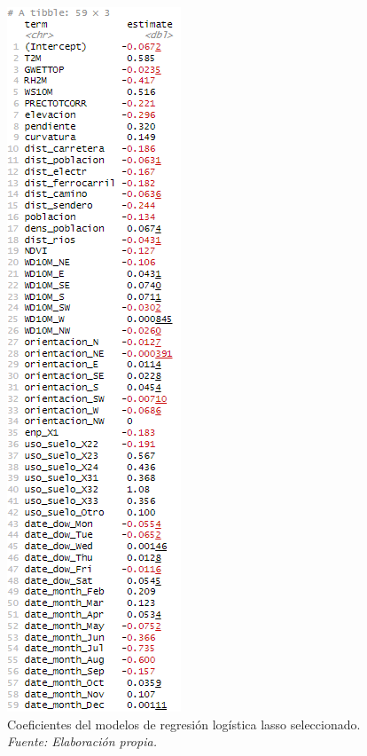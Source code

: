 \documentclass[12pt,a4paper,]{book}
\numberwithin{dummy}{section}
\theoremstyle{ocrenumbox}
\theoremstyle{blacknumex}
\theoremstyle{blacknumbox}
\theoremstyle{ocrenum}
\theoremstyle{ocrenum}
\begin{document}
\begin{figure}[H]
\centering
\includegraphics[width=\textwidth,height=0.85\textheight,keepaspectratio]{graficos/lr_coef.png}
\caption[Coeficientes del modelos de regresión logística lasso seleccionado]{Coeficientes del modelos de regresión logística lasso seleccionado. \it Fuente: Elaboración propia.}
\label{fig:lr_coef}
\end{figure}
\end{document}
